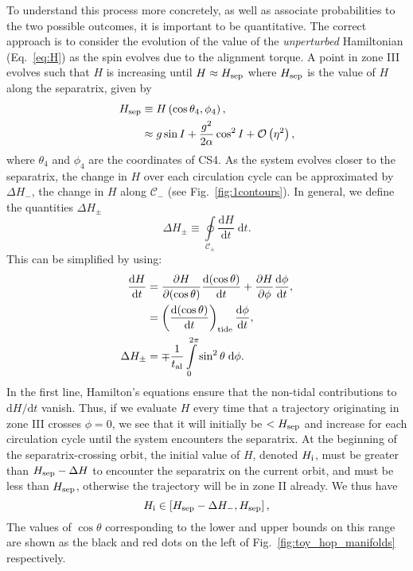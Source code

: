 \documentclass[
        fleqn,
        usenatbib,
    ]{mnras}
\newcommand*{\rd}[2]{\frac{\mathrm{d}#1}{\mathrm{d}#2}}
\newcommand*{\pd}[2]{\frac{\partial#1}{\partial#2}}
\newcommand*{\rdil}[2]{\mathrm{d}#1/\mathrm{d}#2}
\newcommand*{\p}[1]{\left(#1\right)}
\newcommand*{\s}[1]{\left[#1\right]}
\begin{document}
To understand this process more concretely, as well as associate probabilities
to the two possible outcomes, it is important to be quantitative. The correct
approach is to consider the evolution of the value of the \emph{unperturbed}
Hamiltonian (Eq.~\ref{eq:H}) as the spin evolves due to the alignment torque. A
point in zone III evolves such that $H$ is increasing until $H \approx H_{\rm
sep}$ where $H_{\rm sep}$ is the value of $H$ along the separatrix, given by
\begin{align}
    H_{\rm sep} &\equiv H\p{\cos \theta_{\rm 4}, \phi_{\rm 4}},\nonumber\\
        &\approx g\sin I + \frac{g^2}{2\alpha}\cos^2 I +
            \mathcal{O}\p{\eta^2},\label{eq:def_Hsep}
\end{align}
where $\theta_4$ and $\phi_4$ are the coordinates of CS4. As the system evolves
closer to the separatrix, the change in $H$ over each circulation cycle can be
approximated by $\Delta H_-$, the change in $H$ along $\mathcal{C}_-$ (see
Fig.~\ref{fig:1contours}). In general, we define the quantities $\Delta H_{\pm}$
\begin{equation}
    \Delta H_{\pm} \equiv \oint\limits_{\mathcal{C}_{\pm}}
        \rd{H}{t}\;\mathrm{d}t.\label{eq:def_dHpm}
\end{equation}
This can be simplified by using:
\begin{align}
    \rd{H}{t} &=
            \pd{H}{(\cos \theta)}\rd{(\cos \theta)}{t}
            + \pd{H}{\phi}\rd{\phi}{t},\nonumber\\
        &= \p{\rd{(\cos\theta)}{t}}_{\rm tide} \rd{\phi}{t},\\
    \Delta H_{\pm} &= \mp\frac{1}{t_{\rm al}}
        \int\limits_0^{2\pi} \sin^2\theta\;\mathrm{d}\phi.
\end{align}
In the first line, Hamilton's equations ensure that the non-tidal contributions
to $\rdil{H}{t}$ vanish. Thus, if we evaluate $H$ every time that a trajectory
originating in zone III crosses $\phi = 0$, we see that it will initially be $<
H_{\rm sep}$ and increase for each circulation cycle until the system encounters
the separatrix. At the beginning of the separatrix-crossing orbit, the initial
value of $H$, denoted $H_{\rm i}$, must be greater than $H_{\rm sep} - \Delta H$
to encounter the separatrix on the current orbit, and must be less than $H_{\rm
sep}$, otherwise the trajectory will be in zone II already. We thus have
\begin{equation}
    H_{\rm i} \in \s{ H_{\rm sep} - \Delta H_-,  H_{\rm sep} }
        \label{eq:Hi_range},
\end{equation}
The values of $\cos \theta$ corresponding to the lower and upper bounds on this
range are shown as the black and red dots on the left of
Fig.~\ref{fig:toy_hop_manifolds} respectively.
\end{document}

